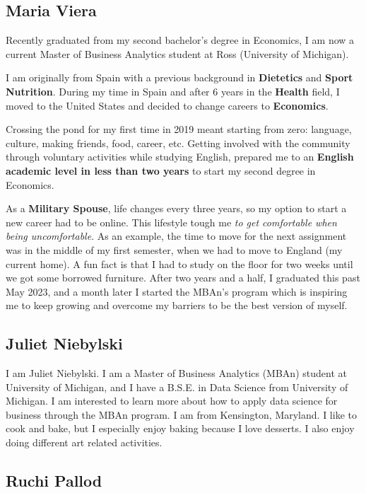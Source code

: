\documentclass[
]{article}
\begin{document}
\hypertarget{maria-viera}{%
\subsection{Maria Viera}\label{maria-viera}}

Recently graduated from my second bachelor's degree in Economics, I am now a current Master of Business Analytics student at Ross (University of Michigan).

I am originally from Spain with a previous background in \textbf{Dietetics} and \textbf{Sport Nutrition}. During my time in Spain and after 6 years in the \textbf{Health} field, I moved to the United States and decided to change careers to \textbf{Economics}.

Crossing the pond for my first time in 2019 meant starting from zero: language, culture, making friends, food, career, etc. Getting involved with the community through voluntary activities while studying English, prepared me to an \textbf{English academic level in less than two years} to start my second degree in Economics.

As a \textbf{Military Spouse}, life changes every three years, so my option to start a new career had to be online. This lifestyle tough me \emph{to get comfortable when being uncomfortable}. As an example, the time to move for the next assignment was in the middle of my first semester, when we had to move to England (my current home). A fun fact is that I had to study on the floor for two weeks until we got some borrowed furniture. After two years and a half, I graduated this past May 2023, and a month later I started the MBAn's program which is inspiring me to keep growing and overcome my barriers to be the best version of myself.

\hypertarget{juliet-niebylski}{%
\subsection{Juliet Niebylski}\label{juliet-niebylski}}

I am Juliet Niebylski. I am a Master of Business Analytics (MBAn) student at University of Michigan, and I have a B.S.E. in Data Science from University of Michigan. I am interested to learn more about how to apply data science for business through the MBAn program. I am from Kensington, Maryland. I like to cook and bake, but I especially enjoy baking because I love desserts. I also enjoy doing different art related activities.

\hypertarget{ruchi-pallod}{%
\subsection{Ruchi Pallod}\label{ruchi-pallod}}
\end{document}
